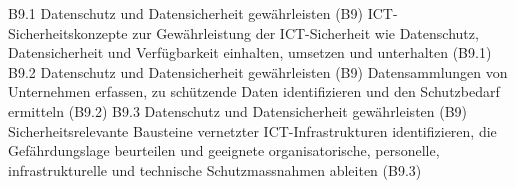 \templateCard
  {B9.1}
  {Datenschutz und Datensicherheit gewährleisten (B9)}
  {ICT-Sicherheitskonzepte zur Gewährleistung der ICT-Sicherheit wie Datenschutz, Datensicherheit und Verfügbarkeit einhalten, umsetzen und unterhalten (B9.1)}
\templateCard
  {B9.2}
  {Datenschutz und Datensicherheit gewährleisten (B9)}
  {Datensammlungen von Unternehmen erfassen, zu schützende Daten identifizieren und den Schutzbedarf ermitteln (B9.2)}
\templateCard
  {B9.3}
  {Datenschutz und Datensicherheit gewährleisten (B9)}
  {Sicherheitsrelevante Bausteine vernetzter ICT-Infrastrukturen identifizieren, die Gefährdungslage beurteilen und geeignete organisatorische, personelle, infrastrukturelle und technische Schutzmassnahmen ableiten (B9.3)}
